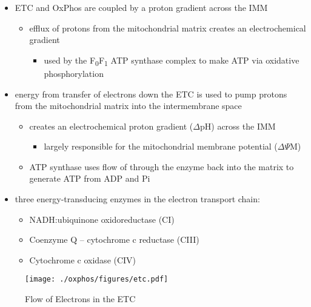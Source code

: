 \documentclass[12pt]{scrartcl}
\begin{document}
\begin{itemize}
\item ETC and OxPhos are coupled by a proton gradient across the IMM
\begin{itemize}
\item efflux of protons from the mitochondrial matrix creates an
electrochemical gradient
\begin{itemize}
\item used by the F\textsubscript{0}F\textsubscript{1} ATP synthase complex to make ATP via oxidative phosphorylation
\end{itemize}
\end{itemize}
\item energy from transfer of electrons down the ETC is used to pump
protons from the mitochondrial matrix into the intermembrane space
\begin{itemize}
\item creates an electrochemical proton gradient (\(\Delta\)pH) across the IMM
\begin{itemize}
\item largely responsible for the mitochondrial membrane potential (\(\Delta \Psi\)M)
\end{itemize}
\item ATP synthase uses flow of  through the enzyme back into the
matrix to generate ATP from ADP and Pi
\end{itemize}
\item three energy-transducing enzymes in the electron transport chain:
\begin{itemize}
\item NADH:ubiquinone oxidoreductase (CI)
\item Coenzyme Q – cytochrome c reductase (CIII)
\item Cytochrome c oxidase (CIV)
\end{itemize}
\end{itemize}


\begin{figure}[htbp]
\centering
\texttt{[image: ./oxphos/figures/etc.pdf]}
\caption{\label{fig:org985dada}Flow of Electrons in the ETC}
\end{figure}
\end{document}

